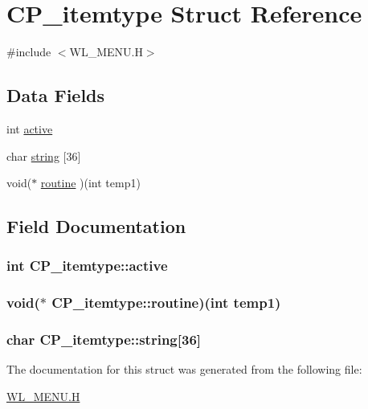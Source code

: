\hypertarget{structCP__itemtype}{
\section{CP\_\-itemtype Struct Reference}
\label{structCP__itemtype}
}


{\ttfamily \#include $<$WL\_\-MENU.H$>$}

\subsection*{Data Fields}
\begin{DoxyCompactItemize}
\item 
int \hyperlink{structCP__itemtype_ae68fe3e3327ca389311abaa6359a1570}{active}
\item 
char \hyperlink{structCP__itemtype_a81042aa33b5c4de6d6c25e631826602c}{string} \mbox{[}36\mbox{]}
\item 
void($\ast$ \hyperlink{structCP__itemtype_ae0bb75e8169853305dd8ed3a612ddf77}{routine} )(int temp1)
\end{DoxyCompactItemize}


\subsection{Field Documentation}
\hypertarget{structCP__itemtype_ae68fe3e3327ca389311abaa6359a1570}{
\subsubsection[{active}]{\setlength{\rightskip}{0pt plus 5cm}int {\bf CP\_\-itemtype::active}}}
\label{structCP__itemtype_ae68fe3e3327ca389311abaa6359a1570}
\hypertarget{structCP__itemtype_ae0bb75e8169853305dd8ed3a612ddf77}{
\subsubsection[{routine}]{\setlength{\rightskip}{0pt plus 5cm}void($\ast$  {\bf CP\_\-itemtype::routine})(int temp1)}}
\label{structCP__itemtype_ae0bb75e8169853305dd8ed3a612ddf77}
\hypertarget{structCP__itemtype_a81042aa33b5c4de6d6c25e631826602c}{
\subsubsection[{string}]{\setlength{\rightskip}{0pt plus 5cm}char {\bf CP\_\-itemtype::string}\mbox{[}36\mbox{]}}}
\label{structCP__itemtype_a81042aa33b5c4de6d6c25e631826602c}


The documentation for this struct was generated from the following file:\begin{DoxyCompactItemize}
\item 
\hyperlink{WL__MENU_8H}{WL\_\-MENU.H}\end{DoxyCompactItemize}
